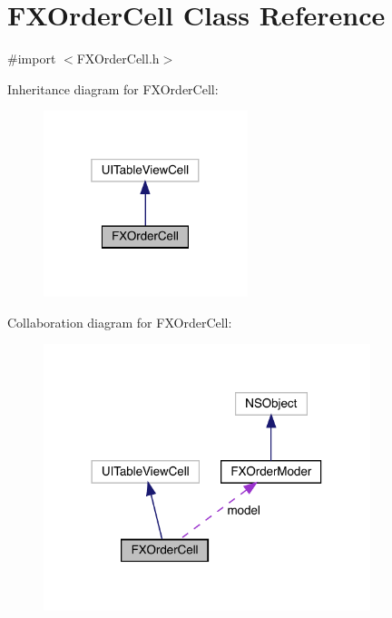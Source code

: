 \hypertarget{interface_f_x_order_cell}{}\section{F\+X\+Order\+Cell Class Reference}
\label{interface_f_x_order_cell}


{\ttfamily \#import $<$F\+X\+Order\+Cell.\+h$>$}



Inheritance diagram for F\+X\+Order\+Cell\+:\nopagebreak
\begin{figure}[H]
\begin{center}
\leavevmode
\includegraphics[width=169pt]{interface_f_x_order_cell__inherit__graph}
\end{center}
\end{figure}


Collaboration diagram for F\+X\+Order\+Cell\+:\nopagebreak
\begin{figure}[H]
\begin{center}
\leavevmode
\includegraphics[width=270pt]{interface_f_x_order_cell__coll__graph}
\end{center}
\end{figure}

